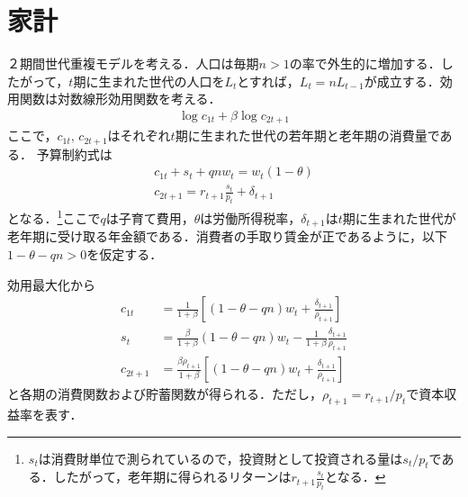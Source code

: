 \documentclass[12pt,a4paper]{jsarticle}
\begin{document}





\section{家計}
２期間世代重複モデルを考える．人口は毎期$n>1$の率で外生的に増加する．したがって，$t$期に生まれた世代の人口を$L_{t}$とすれば，$L_{t} = nL_{t-1}$が成立する．効用関数は対数線形効用関数を考える．
\begin{align}
 \log c_{1t} + \beta \log c_{2 t+1}
\end{align}
ここで，$c_{1 t}, \, c_{2 t+1}$はそれぞれ$t$期に生まれた世代の若年期と老年期の消費量である．
予算制約式は
\begin{align}
 c_{1 t} + s_{t} +qnw_{t} = w_{t}(1-\theta) \\
c_{2 t+1} = r_{t+1}\frac{s_{t}}{p_{t}} + \delta_{t+1} 
\end{align}
となる．\footnote{$s_{t}$は消費財単位で測られているので，投資財として投資される量は$s_{t}/p_{t}$である．したがって，老年期に得られるリターンは$r_{t+1}\frac{s_{t}}{p_{t}}$となる．}ここで$q$は子育て費用，$\theta$は労働所得税率，$\delta_{t+1}$は$t$期に生まれた世代が老年期に受け取る年金額である．消費者の手取り賃金が正であるように，以下$1-\theta-qn>0$を仮定する．

効用最大化から
\begin{align}
	c_{1t} &=\frac{1}{1+\beta} \left[ (1-\theta-qn)w_{t} + \frac{\delta_{t+1}}{\rho_{t+1}} \right] \label{eq:13}\\
	s_{t} &= \frac{\beta}{1+\beta}(1-\theta-qn)w_{t}- \frac{1}{1+\beta}\frac{\delta_{t+1}}{\rho_{t+1}} \label{eq:14} \\
	c_{2t+1} &= \frac{\beta \rho_{t+1}}{1+\beta}\left[(1-\theta-qn)w_{t}+ \frac{\delta_{t+1}}{\rho_{t+1}} \right] \label{eq:15}
\end{align}
と各期の消費関数および貯蓄関数が得られる．ただし，$\rho_{t+1} = r_{t+1}/p_{t}$で資本収益率を表す．
\end{document}
